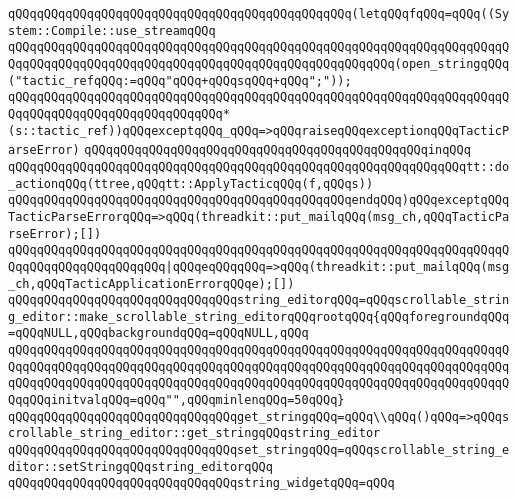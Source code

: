 \verb|qQQqqQQqqQQqqQQqqQQqqQQqqQQqqQQqqQQqqQQqqQQqqQQq(letqQQqfqQQq=qQQq((System::Compile::use_streamqQQq|\newline
\verb|qQQqqQQqqQQqqQQqqQQqqQQqqQQqqQQqqQQqqQQqqQQqqQQqqQQqqQQqqQQqqQQqqQQqqQQqqQQqqQQqqQQqqQQqqQQqqQQqqQQqqQQqqQQqqQQqqQQqqQQqqQQq(open_stringqQQq("tactic_refqQQq:=qQQq"qQQq+qQQqsqQQq+qQQq";"));|\newline
\verb|qQQqqQQqqQQqqQQqqQQqqQQqqQQqqQQqqQQqqQQqqQQqqQQqqQQqqQQqqQQqqQQqqQQqqQQqqQQqqQQqqQQqqQQqqQQqqQQqqQQq*(s::tactic_ref))qQQqexceptqQQq_qQQq=>qQQqraiseqQQqexceptionqQQqTacticParseError)|\newline
\verb|qQQqqQQqqQQqqQQqqQQqqQQqqQQqqQQqqQQqqQQqqQQqqQQqinqQQq|\newline
\verb|qQQqqQQqqQQqqQQqqQQqqQQqqQQqqQQqqQQqqQQqqQQqqQQqqQQqqQQqqQQqqQQqtt::do_actionqQQq(ttree,qQQqtt::ApplyTacticqQQq(f,qQQqs))|\newline
\verb|qQQqqQQqqQQqqQQqqQQqqQQqqQQqqQQqqQQqqQQqqQQqqQQqendqQQq)qQQqexceptqQQqTacticParseErrorqQQq=>qQQq(threadkit::put_mailqQQq(msg_ch,qQQqTacticParseError);[])|\newline
\verb|qQQqqQQqqQQqqQQqqQQqqQQqqQQqqQQqqQQqqQQqqQQqqQQqqQQqqQQqqQQqqQQqqQQqqQQqqQQqqQQqqQQqqQQqqQQq|\verb#|qQQqeqQQqqQQq=>qQQq(threadkit::put_mailqQQq(msg_ch,qQQqTacticApplicationErrorqQQqe);[])#\newline
\newline
\newline
\newline
\verb|qQQqqQQqqQQqqQQqqQQqqQQqqQQqqQQqstring_editorqQQq=qQQqscrollable_string_editor::make_scrollable_string_editorqQQqrootqQQq{qQQqforegroundqQQq=qQQqNULL,qQQqbackgroundqQQq=qQQqNULL,qQQq|\newline
\verb|qQQqqQQqqQQqqQQqqQQqqQQqqQQqqQQqqQQqqQQqqQQqqQQqqQQqqQQqqQQqqQQqqQQqqQQqqQQqqQQqqQQqqQQqqQQqqQQqqQQqqQQqqQQqqQQqqQQqqQQqqQQqqQQqqQQqqQQqqQQqqQQqqQQqqQQqqQQqqQQqqQQqqQQqqQQqqQQqqQQqqQQqqQQqqQQqqQQqqQQqqQQqqQQqqQQqqQQqinitvalqQQq=qQQq"",qQQqminlenqQQq=50qQQq}|\newline
\verb|qQQqqQQqqQQqqQQqqQQqqQQqqQQqqQQqget_stringqQQq=qQQq\\qQQq()qQQq=>qQQqscrollable_string_editor::get_stringqQQqstring_editor|\newline
\verb|qQQqqQQqqQQqqQQqqQQqqQQqqQQqqQQqset_stringqQQq=qQQqscrollable_string_editor::setStringqQQqstring_editorqQQq|\newline
\newline
\verb|qQQqqQQqqQQqqQQqqQQqqQQqqQQqqQQqstring_widgetqQQq=qQQq|\newline

